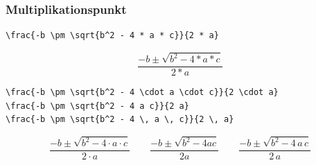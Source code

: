 \documentclass{beamer}
\begin{document}
\begin{frame}[fragile]
    \frametitle{Multiplikationspunkt}
    \begin{wrong}
        \begin{lstlisting}
\frac{-b \pm \sqrt{b^2 - 4 * a * c}}{2 * a}
        \end{lstlisting}
    \end{wrong}
    \pause
    \begin{wrong}
        \begin{equation*}
            \frac{-b \pm \sqrt{b^2 - 4 * a * c}}{2 * a}
        \end{equation*}
    \end{wrong}
    \pause
    \begin{lstlisting}
\frac{-b \pm \sqrt{b^2 - 4 \cdot a \cdot c}}{2 \cdot a}
\frac{-b \pm \sqrt{b^2 - 4 a c}}{2 a}
\frac{-b \pm \sqrt{b^2 - 4 \, a \, c}}{2 \, a}
    \end{lstlisting}

    \begin{equation*}
        \frac{-b \pm \sqrt{b^2 - 4 \cdot a \cdot c}}{2 \cdot a}
        \qquad
        \frac{-b \pm \sqrt{b^2 - 4 a c}}{2 a}
        \qquad
        \frac{-b \pm \sqrt{b^2 - 4 \, a \, c}}{2 \, a}
    \end{equation*}
    \pause
\end{frame}
\end{document}
